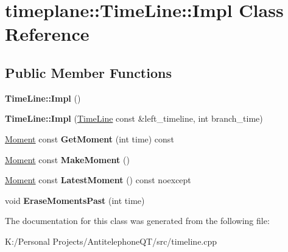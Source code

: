\hypertarget{class_time_line_1_1_impl}{}\section{timeplane\+:\+:Time\+Line\+:\+:Impl Class Reference}
\label{class_time_line_1_1_impl}
\subsection*{Public Member Functions}
\begin{DoxyCompactItemize}
\item 
\mbox{\label{class_time_line_1_1_impl_a3d9f319001a6c4e7c70b5f34aead8f4e}} 
{\bfseries Time\+Line\+::\+Impl} ()
\item 
\mbox{\label{class_time_line_1_1_impl_a47394c57d3b6eeb7770e30b75a961cd2}} 
{\bfseries Time\+Line\+::\+Impl} (\hyperlink{classtimeplane_1_1_time_line}{Time\+Line} const \&left\+\_\+timeline, int branch\+\_\+time)
\item 
\mbox{\label{class_time_line_1_1_impl_af6e87baaa28f97c426a47c29dff3a291}} 
\hyperlink{classtimeplane_1_1_moment}{Moment} const {\bfseries Get\+Moment} (int time) const
\item 
\mbox{\label{class_time_line_1_1_impl_af977b2549df763890aa218133901c867}} 
\hyperlink{classtimeplane_1_1_moment}{Moment} const {\bfseries Make\+Moment} ()
\item 
\mbox{\label{class_time_line_1_1_impl_a29d82c996a9bd5870c6990d532f0df68}} 
\hyperlink{classtimeplane_1_1_moment}{Moment} const {\bfseries Latest\+Moment} () const noexcept
\item 
\mbox{\label{class_time_line_1_1_impl_a29b97a99dd6410120037ea9d2f8b0339}} 
void {\bfseries Erase\+Moments\+Past} (int time)
\end{DoxyCompactItemize}


The documentation for this class was generated from the following file\+:\begin{DoxyCompactItemize}
\item 
K\+:/\+Personal Projects/\+Antitelephone\+Q\+T/src/timeline.\+cpp\end{DoxyCompactItemize}

